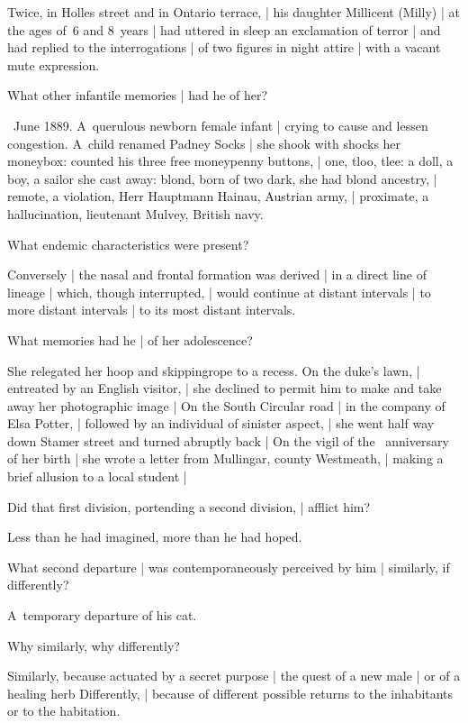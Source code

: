 \Memories
Twice, in Holles street and in Ontario terrace, |
his daughter Millicent (Milly) |
at the ages of~6 and 8~years |
had uttered in sleep an exclamation of terror |
and had replied to the interrogations |
of two figures in night attire |
with a vacant mute expression.


What other infantile memories |
had he of her?

~June 1889.
A~querulous newborn female infant |
crying to cause and lessen congestion.
A~child renamed Padney Socks |
she shook with shocks her moneybox:
counted his three free moneypenny buttons, |
one, tloo, tlee:
a doll, a boy, a sailor she cast away:
blond, born of two dark, she had blond ancestry, |
remote, a violation, Herr Hauptmann Hainau, Austrian army, |
proximate, a hallucination,
lieutenant Mulvey, British navy.


What endemic characteristics were present?

\Science
Conversely |
the nasal and frontal formation was derived |
in a direct line of lineage |
which, though interrupted, |
would continue at distant intervals |
to more distant intervals |
to its most distant intervals.


What memories had he |
of her adolescence?

\Factual[~(legal)]
She relegated her hoop and skippingrope to a recess.
On the duke's lawn, |
entreated by an English visitor, |
she declined to permit him to make and take away her photographic image |
On the South Circular road |
in the company of Elsa Potter, |
followed by an individual of sinister aspect, |
she went half way down Stamer street and turned abruptly back |
On the vigil of the ~anniversary of her birth |
she wrote a letter from Mullingar, county Westmeath, |
making a brief allusion to a local student |


Did that first division,
portending a second division, |
afflict him?

\Philosophy
Less than he had imagined,
more than he had hoped.


What second departure |
was contemporaneously perceived by him |
similarly, if differently?

\Factual
A~temporary departure of his cat.


Why similarly,
why differently?

\Philosophy
Similarly, because actuated by a secret purpose |
the quest of a new male
 |
or of a healing herb
Differently, |
because of different possible returns to the inhabitants or to the habitation.


